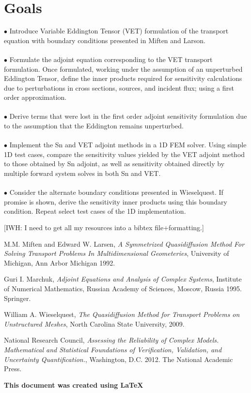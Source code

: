\documentclass{article}
\begin{document}
\section{Goals}
$\bullet$ Introduce Variable Eddington Tensor (VET) formulation of the transport equation with boundary conditions presented in Miften and Larson.
\\ \\
$\bullet$ Formulate the adjoint equation corresponding to the VET transport formulation. Once formulated, working under the assumption of an unperturbed Eddington Tensor, define the inner products required for sensitivity calculations due to perturbations in cross sections, sources, and incident flux; using a first order approximation.
\\ \\
$\bullet$ Derive terms that were lost in the first order adjoint sensitivity formulation due to the assumption that the Eddington remains unperturbed. 
\\ \\
$\bullet$ Implement the Sn and VET adjoint methods in a 1D FEM solver. Using simple 1D test cases, compare the sensitivity values yielded by the VET adjoint method to those obtained by Sn adjoint, as well as sensitivity obtained directly by multiple forward system solves in both Sn and VET.
\\ \\
$\bullet$ Consider the alternate boundary conditions presented in Wieselquest. If promise is shown, derive the sensitivity inner products using this boundary condition. Repeat select test cases of the 1D implementation.


\newpage

{\color{red}[IWH: I need to get all my resources into a bibtex file+formatting.]}
\begin{thebibliography}{9}


  M.M. Miften and Edward W. Larsen, \emph{A Symmetrized Quasidiffusion Method For Solving Transport Problems In Multidimensional Geometeries}, University of Michigan, Ann Arbor Michigan 1992.
  
  
  Guri I. Marchuk, \emph{Adjoint Equations and Analysis of Complex Systems}, Institute of Numerical Mathematics, Russian Academy of Sciences, Moscow, Russia 1995. Springer.
  
  
  William A. Wieselquest, \emph{The Quasidiffusion Method for Transport Problems on Unstructured Meshes}, North Carolina State University, 2009.

  National Research Council, \emph{Assessing the Reliability of Complex Models. Mathematical and Statistical Foundations of Verification, Validation, and Uncertainty Quantification.}, Washington, D.C. 2012. The National Academic Press.



\end{thebibliography}

\textbf{This document was created using \LaTeX}
\end{document}

